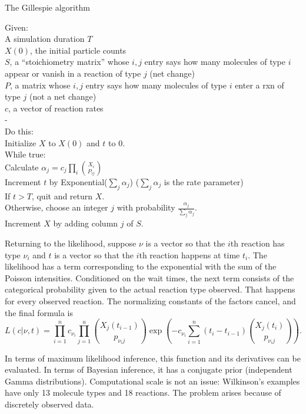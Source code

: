 \documentclass{article}
\begin{document}
\begin{algorithm}[h]
\caption{The Gillespie algorithm \label{alg:gillespie}}
Given:\\
\Indp
A simulation duration $T$\\
$X(0)$, the initial particle counts\\
$S$, a ``stoichiometry matrix'' whose $i,j$ entry says how many molecules of type $i$ appear or vanish in a reaction of type $j$ (net change)\\
$P$, a matrix whose $i,j$ entry says how many molecules of type $i$ enter a rxn of type $j$ (not a net change)\\
$c$, a vector of reaction rates\\
-\\
\Indm
Do this:\\
\Indp
Initialize $X$ to $X(0)$ and $t$ to 0.\\
While true:\\
\Indp
Calculate $\alpha_j = c_j\prod_i {X_i\choose P_{ij}}$\\
Increment $t$ by Exponential($\sum_j \alpha_j$) ($\sum_j \alpha_j$ is the rate parameter)\\
If $t > T$, quit and return $X$.\\
Otherwise, choose an integer $j$ with probability $\frac{\alpha_j}{\sum_j \alpha_j}$.\\
Increment $X$ by adding column $j$ of $S$.\\
\end{algorithm}


Returning to the likelihood, suppose $\nu$ is a vector so that the $i$th reaction has type $\nu_i$ and $t$ is a vector so that the $i$th reaction happens at time $t_i$. The likelihood has a term corresponding to the exponential with the sum of the Poisson intensities. Conditioned on the wait times, the next term consists of the categorical probability given to the actual reaction type observed. That happens for every observed reaction. The normalizing constants of the factors cancel, and the final formula is $$L(c|\nu, t) = \prod_{i=1}^n c_{\nu_{i}} \prod_{j=1}^u {{X_{j}(t_{i-1})}\choose{p_{{\nu_{i}}j}}}\exp\left(-c_{\nu_{i}}\sum_{i=1}^{n} (t_{i}-t_{i-1}) {{X_j(t_{i})}\choose{p_{{\nu_{i}}j}}}\right).$$

In terms of maximum likelihood inference, this function and its derivatives can be evaluated. In terms of Bayesian inference, it has a conjugate prior (independent Gamma distributions). Computational scale is not an issue: Wilkinson's examples have only 13 molecule types and 18 reactions. The problem arises because of discretely observed data.
\end{document}

